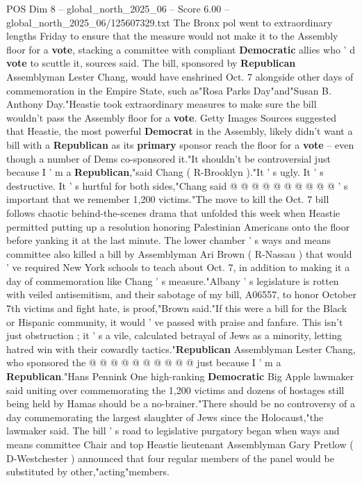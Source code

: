 \begin{textsample}{POS Dim 8 – global\_north\_2025\_06 – Score 6.00 – global\_north\_2025\_06/125607329.txt}  \label{ex:f8_pos_436}
The Bronx pol went to extraordinary lengths Friday to ensure that the measure would not make it to the Assembly floor for a \textbf{vote}, stacking a committee with compliant \textbf{Democratic} allies who ' d \textbf{vote} to scuttle it, sources said.
The bill, sponsored by \textbf{Republican} Assemblyman Lester Chang, would have enshrined Oct. 7 alongside other days of commemoration in the Empire State, such as"Rosa Parks Day"and"Susan B.
Anthony Day."Heastie took extraordinary measures to make sure the bill wouldn't pass the Assembly floor for a \textbf{vote}.
Getty Images Sources suggested that Heastie, the most powerful \textbf{Democrat} in the Assembly, likely didn't want a bill with a \textbf{Republican} as its \textbf{primary} sponsor reach the floor for a \textbf{vote} -- even though a number of Dems co-sponsored it."It shouldn't be controversial just because I ' m a \textbf{Republican},"said Chang ( R-Brooklyn )."It ' s ugly.
It ' s destructive.
It ' s hurtful for both sides,"Chang said @ @ @ @ @ @ @ @ @ @ ' s important that we remember 1,200 victims."The move to kill the Oct. 7 bill follows chaotic behind-the-scenes drama that unfolded this week when Heastie permitted putting up a resolution honoring Palestinian Americans onto the floor before yanking it at the last minute.
The lower chamber ' s ways and means committee also killed a bill by Assemblyman Ari Brown ( R-Nassau ) that would ' ve required New York schools to teach about Oct. 7, in addition to making it a day of commemoration like Chang ' s measure."Albany ' s legislature is rotten with veiled antisemitism, and their sabotage of my bill, A06557, to honor October 7th victims and fight hate, is proof,"Brown said."If this were a bill for the Black or Hispanic community, it would ' ve passed with praise and fanfare.
This isn't just obstruction ; it ' s a vile, calculated betrayal of Jews as a minority, letting hatred win with their cowardly tactics."\textbf{Republican} Assemblyman Lester Chang, who sponsored the @ @ @ @ @ @ @ @ @ @ just because I ' m a \textbf{Republican}."Hans Pennink One high-ranking \textbf{Democratic} Big Apple lawmaker said uniting over commemorating the 1,200 victims and dozens of hostages still being held by Hamas should be a no-brainer."There should be no controversy of a day commemorating the largest slaughter of Jews since the Holocaust,"the lawmaker said.
The bill ' s road to legislative purgatory began when ways and means committee Chair and top Heastie lieutenant Assemblyman Gary Pretlow ( D-Westchester ) announced that four regular members of the panel would be substituted by other,"acting"members.

\end{textsample}
